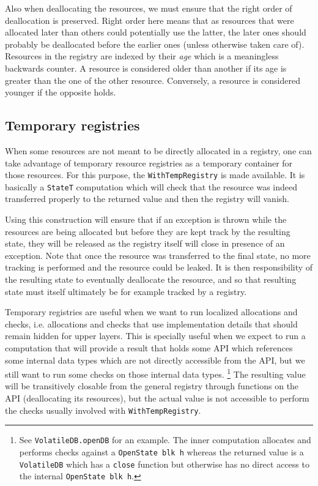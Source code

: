 Also when deallocating the resources, we must ensure that the right order of
deallocation is preserved. Right order here means that as resources that were
allocated later than others could potentially use the latter, the later ones
should probably be deallocated before the earlier ones (unless otherwise taken
care of). Resources in the registry are indexed by their \emph{age} which is a
meaningless backwards counter. A resource is considered older than another if
its age is greater than the one of the other resource. Conversely, a resource is
considered younger if the opposite holds.

\subsection{Temporary registries}
\label{nonfunctional:temporaryregs}

When some resources are not meant to be directly allocated in a registry, one
can take advantage of temporary resource registries as a temporary container for
those resources. For this purpose, the \lstinline!WithTempRegistry! is made
available. It is basically a \lstinline!StateT! computation which will check
that the resource was indeed transferred properly to the returned value and then
the registry will vanish.

Using this construction will ensure that if an exception is thrown while the
resources are being allocated but before they are kept track by the resulting
state, they will be released as the registry itself will close in presence of an
exception. Note that once the resource was transferred to the final state, no
more tracking is performed and the resource could be leaked. It is then
responsibility of the resulting state to eventually deallocate the resource, and
so that resulting state must itself ultimately be for example tracked by a
registry.

Temporary registries are useful when we want to run localized allocations and
checks, i.e. allocations and checks that use implementation details that should
remain hidden for upper layers. This is specially useful when we expect to run a
computation that will provide a result that holds some API which references some
internal data types which are not directly accessible from the API, but we still
want to run some checks on those internal data types. \footnote{See
  \lstinline!VolatileDB.openDB! for an example. The inner computation allocates
  and performs checks against a \lstinline!OpenState blk h! whereas the returned
  value is a \lstinline!VolatileDB! which has a \lstinline!close! function but
  otherwise has no direct access to the internal \lstinline!OpenState blk h!.}
The resulting value will be transitively closable from the general registry
through functions on the API (deallocating its resources), but the actual value
is not accessible to perform the checks usually involved with
\lstinline!WithTempRegistry!.

